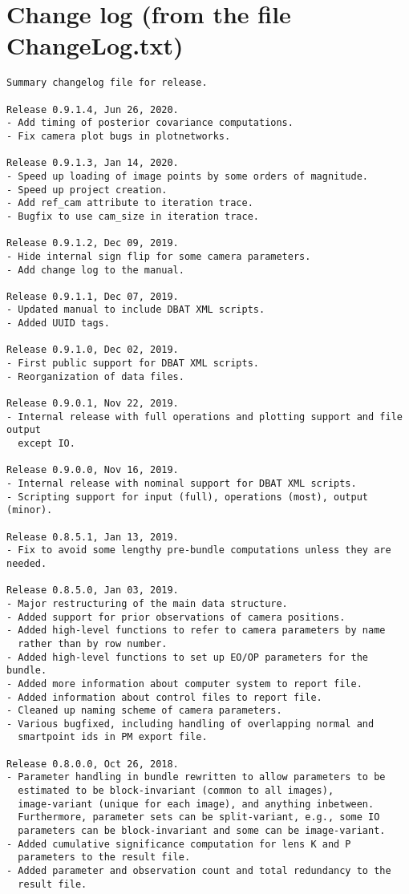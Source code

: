 \documentclass{article}
\begin{document}
\section[Change log]{Change log (from the file ChangeLog.txt)}
\label{sec:changeLog}
\begin{verbatim}
Summary changelog file for release.

Release 0.9.1.4, Jun 26, 2020.
- Add timing of posterior covariance computations.
- Fix camera plot bugs in plotnetworks.

Release 0.9.1.3, Jan 14, 2020.
- Speed up loading of image points by some orders of magnitude.
- Speed up project creation.
- Add ref_cam attribute to iteration trace.
- Bugfix to use cam_size in iteration trace.

Release 0.9.1.2, Dec 09, 2019.
- Hide internal sign flip for some camera parameters.
- Add change log to the manual.

Release 0.9.1.1, Dec 07, 2019.
- Updated manual to include DBAT XML scripts.
- Added UUID tags.

Release 0.9.1.0, Dec 02, 2019.
- First public support for DBAT XML scripts.
- Reorganization of data files.

Release 0.9.0.1, Nov 22, 2019.
- Internal release with full operations and plotting support and file output
  except IO.

Release 0.9.0.0, Nov 16, 2019.
- Internal release with nominal support for DBAT XML scripts.
- Scripting support for input (full), operations (most), output (minor).

Release 0.8.5.1, Jan 13, 2019.
- Fix to avoid some lengthy pre-bundle computations unless they are needed.

Release 0.8.5.0, Jan 03, 2019.
- Major restructuring of the main data structure.
- Added support for prior observations of camera positions.
- Added high-level functions to refer to camera parameters by name
  rather than by row number.
- Added high-level functions to set up EO/OP parameters for the bundle.
- Added more information about computer system to report file.
- Added information about control files to report file.
- Cleaned up naming scheme of camera parameters.
- Various bugfixed, including handling of overlapping normal and
  smartpoint ids in PM export file.

Release 0.8.0.0, Oct 26, 2018.
- Parameter handling in bundle rewritten to allow parameters to be
  estimated to be block-invariant (common to all images),
  image-variant (unique for each image), and anything inbetween.
  Furthermore, parameter sets can be split-variant, e.g., some IO
  parameters can be block-invariant and some can be image-variant.
- Added cumulative significance computation for lens K and P
  parameters to the result file.
- Added parameter and observation count and total redundancy to the
  result file.


\end{verbatim}
\end{document}
